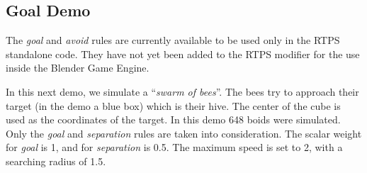 \subsection{Goal Demo}
The \textit{goal} and \textit{avoid} rules are currently available to be used only in the RTPS standalone code. They have not yet been added to the RTPS modifier for the use inside the Blender Game Engine. 

In this next demo, we simulate a ``\textit{swarm of bees}''. The bees try to approach their target (in the demo a blue box) which is their hive. The center of the cube is used as the coordinates of the target. In this demo 648 boids were simulated. Only the \textit{goal} and \textit{separation} rules are taken into consideration. The scalar weight for \textit{goal} is 1, and for \textit{separation} is 0.5. The maximum speed is set to 2, with a searching radius of 1.5. 

